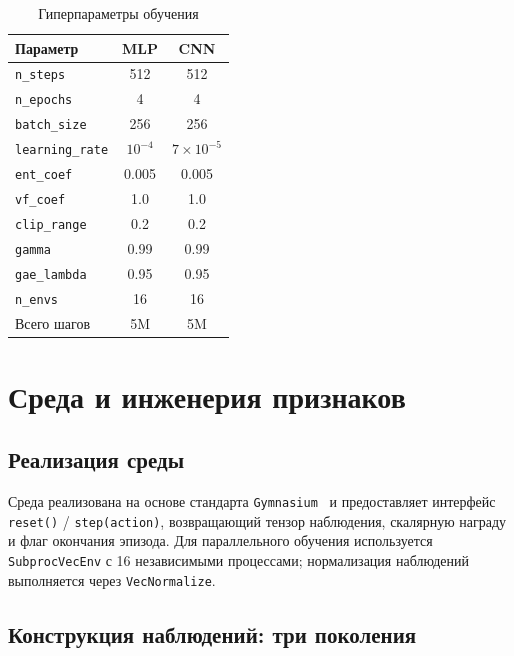 \documentclass[12pt, a4paper]{article}
\begin{document}
\begin{table}[H]
  \centering
  \caption{Гиперпараметры обучения}
  \label{tab:hparams}
  \begin{tabular}{lcc}
    \toprule
    \textbf{Параметр} & \textbf{MLP} & \textbf{CNN} \\
    \midrule
    \texttt{n\_steps}        & 512   & 512   \\
    \texttt{n\_epochs}       & 4     & 4     \\
    \texttt{batch\_size}     & 256   & 256   \\
    \texttt{learning\_rate}  & $10^{-4}$ & $7 \times 10^{-5}$ \\
    \texttt{ent\_coef}       & 0.005 & 0.005 \\
    \texttt{vf\_coef}        & 1.0   & 1.0   \\
    \texttt{clip\_range}     & 0.2   & 0.2   \\
    \texttt{gamma}           & 0.99  & 0.99  \\
    \texttt{gae\_lambda}     & 0.95  & 0.95  \\
    \texttt{n\_envs}         & 16    & 16    \\
    Всего шагов              & 5M    & 5M    \\
    \bottomrule
  \end{tabular}
\end{table}

\section{Среда и инженерия признаков}

\subsection{Реализация среды}

Среда реализована на основе стандарта \texttt{Gymnasium}~\cite{gymnasium2022} и предоставляет интерфейс \texttt{reset()} / \texttt{step(action)}, возвращающий тензор наблюдения, скалярную награду и флаг окончания эпизода. Для параллельного обучения используется \texttt{SubprocVecEnv} с 16 независимыми процессами; нормализация наблюдений выполняется через \texttt{VecNormalize}.

\subsection{Конструкция наблюдений: три поколения}
\end{document}
